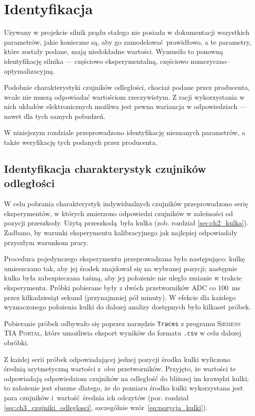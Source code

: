 \chapter{Identyfikacja}
\label{cha:ch5_identyfikacja}

Używany w projekcie silnik prądu stałego nie posiada w dokumentacji wszystkich parametrów, jakie konieczne są, aby go zamodelować prawidłowo, a te parametry, które zostały podane, mają niedokładne wartości. Wymusiło to ponowną identyfikację silnika --- częściowo eksperymentalną, częściowo numeryczno--optymalizacyjną.

Podobnie charakterystyki czujników odległości, chociaż podane przez producenta, wcale nie muszą odpowiadać wartościom rzeczywistym. Z racji wykorzystania w nich układów elektronicznych możliwa jest pewna wariancja w odpowiedziach --- nawet dla tych samych pobudzeń.

W niniejszym rozdziale przeprowadzono identyfikację nieznanych parametrów, a także weryfikację tych podanych przez producenta.

\section{Identyfikacja charakterystyk czujników odległości}
\label{sec:ch5_identyfikacja_charakterystyk_czujnikow}

W celu pobrania charakterystyk indywidualnych czujników przeprowadzono serię eksperymentów, w których zmierzono odpowiedzi czujników w zależności od pozycji przeszkody. Użytą przeszkodą była kulka (zob. rozdział \ref{sec:ch2_kulka}). Zadbano, by warunki eksperymentu kalibracyjnego jak najlepiej odpowiadały przyszłym warunkom pracy.

Procedura pojedynczego eksperymentu przeprowadzana była następująco: kulkę umieszczano tak, aby jej środek znajdował się na wybranej pozycji; następnie kulka była zabezpieczana taśmą, aby jej położenie nie uległo zmianie w trakcie eksperymentu. Próbki pobierane były z dwóch przetworników ADC co \SI{100}{\milli\second} przez kilkadziesiąt sekund (przynajmniej pół minuty). W efekcie dla każdego wyznaczonego położenia kulki do dalszej analizy dostępnych było kilkaset próbek.

Pobieranie próbek odbywało się poprzez narzędzie \texttt{Traces} z programu \textsc{Siemens TIA Portal}, które umożliwia eksport wyników do formatu \texttt{.csv} w celu dalszej obróbki.

Z każdej serii próbek odpowiadającej jednej pozycji środka kulki wyliczono średnią arytmetyczną wartości z~obu przetworników. Przyjęto, że wartości te odpowiadają odpowiedziom czujników na odległość do bliższej im krawędzi kulki; to założenie jest słuszne dlatego, że do pomiaru środka kulki wykorzystana jest para czujników i~wartość średnia ich odczytów (por. rozdział \ref{sec:ch3_czujniki_odleglosci}, szczególnie wzór~\eqref{eq:pozycja_kulki}).

